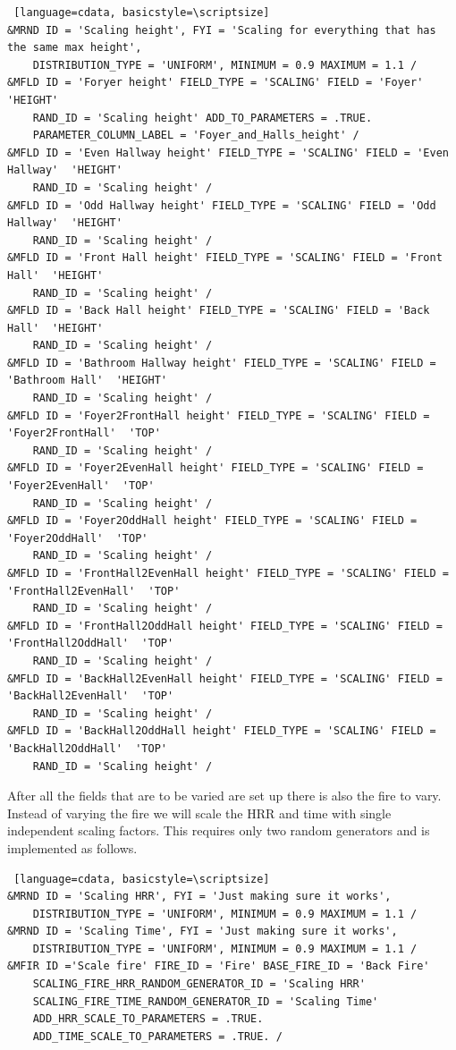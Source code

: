 \documentclass[12pt,twoside]{book}
\begin{document}
\vspace{\baselineskip}
\begin{lstlisting} [language=cdata, basicstyle=\scriptsize]
&MRND ID = 'Scaling height', FYI = 'Scaling for everything that has the same max height', 
	DISTRIBUTION_TYPE = 'UNIFORM', MINIMUM = 0.9 MAXIMUM = 1.1 /
&MFLD ID = 'Foryer height' FIELD_TYPE = 'SCALING' FIELD = 'Foyer'  'HEIGHT'
    RAND_ID = 'Scaling height' ADD_TO_PARAMETERS = .TRUE. 
    PARAMETER_COLUMN_LABEL = 'Foyer_and_Halls_height' /
&MFLD ID = 'Even Hallway height' FIELD_TYPE = 'SCALING' FIELD = 'Even Hallway'  'HEIGHT' 
	RAND_ID = 'Scaling height' /
&MFLD ID = 'Odd Hallway height' FIELD_TYPE = 'SCALING' FIELD = 'Odd Hallway'  'HEIGHT' 
	RAND_ID = 'Scaling height' /
&MFLD ID = 'Front Hall height' FIELD_TYPE = 'SCALING' FIELD = 'Front Hall'  'HEIGHT' 
	RAND_ID = 'Scaling height' /
&MFLD ID = 'Back Hall height' FIELD_TYPE = 'SCALING' FIELD = 'Back Hall'  'HEIGHT' 
	RAND_ID = 'Scaling height' /
&MFLD ID = 'Bathroom Hallway height' FIELD_TYPE = 'SCALING' FIELD = 'Bathroom Hall'  'HEIGHT' 
	RAND_ID = 'Scaling height' /
&MFLD ID = 'Foyer2FrontHall height' FIELD_TYPE = 'SCALING' FIELD = 'Foyer2FrontHall'  'TOP' 
	RAND_ID = 'Scaling height' /
&MFLD ID = 'Foyer2EvenHall height' FIELD_TYPE = 'SCALING' FIELD = 'Foyer2EvenHall'  'TOP' 
	RAND_ID = 'Scaling height' /
&MFLD ID = 'Foyer2OddHall height' FIELD_TYPE = 'SCALING' FIELD = 'Foyer2OddHall'  'TOP' 
	RAND_ID = 'Scaling height' /
&MFLD ID = 'FrontHall2EvenHall height' FIELD_TYPE = 'SCALING' FIELD = 'FrontHall2EvenHall'  'TOP' 
	RAND_ID = 'Scaling height' /
&MFLD ID = 'FrontHall2OddHall height' FIELD_TYPE = 'SCALING' FIELD = 'FrontHall2OddHall'  'TOP' 
	RAND_ID = 'Scaling height' /
&MFLD ID = 'BackHall2EvenHall height' FIELD_TYPE = 'SCALING' FIELD = 'BackHall2EvenHall'  'TOP' 
	RAND_ID = 'Scaling height' /
&MFLD ID = 'BackHall2OddHall height' FIELD_TYPE = 'SCALING' FIELD = 'BackHall2OddHall'  'TOP' 
	RAND_ID = 'Scaling height' /
\end{lstlisting}

After all the fields that are to be varied are set up there is also the fire to vary. Instead of varying the fire we will scale the HRR and time with single independent scaling factors. This requires only two random generators and is implemented as follows.

\vspace{\baselineskip}
\begin{lstlisting} [language=cdata, basicstyle=\scriptsize]
&MRND ID = 'Scaling HRR', FYI = 'Just making sure it works', 
	DISTRIBUTION_TYPE = 'UNIFORM', MINIMUM = 0.9 MAXIMUM = 1.1 /
&MRND ID = 'Scaling Time', FYI = 'Just making sure it works', 
	DISTRIBUTION_TYPE = 'UNIFORM', MINIMUM = 0.9 MAXIMUM = 1.1 /
&MFIR ID ='Scale fire' FIRE_ID = 'Fire' BASE_FIRE_ID = 'Back Fire' 
	SCALING_FIRE_HRR_RANDOM_GENERATOR_ID = 'Scaling HRR'
    SCALING_FIRE_TIME_RANDOM_GENERATOR_ID = 'Scaling Time' 
    ADD_HRR_SCALE_TO_PARAMETERS = .TRUE. 
    ADD_TIME_SCALE_TO_PARAMETERS = .TRUE. /
\end{lstlisting}
\end{document}
